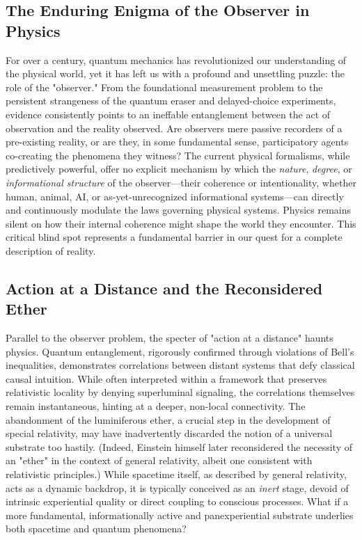 \documentclass[11pt, a4paper]{book}
\begin{document}
\subsection{The Enduring Enigma of the Observer in Physics}
\label{ssec:intro_observer}
For over a century, quantum mechanics has revolutionized our understanding of the physical world, yet it has left us with a profound and unsettling puzzle: the role of the "observer." From the foundational measurement problem to the persistent strangeness of the quantum eraser and delayed-choice experiments, evidence consistently points to an ineffable entanglement between the act of observation and the reality observed. Are observers mere passive recorders of a pre-existing reality, or are they, in some fundamental sense, participatory agents co-creating the phenomena they witness? The current physical formalisms, while predictively powerful, offer no explicit mechanism by which the \emph{nature}, \emph{degree}, or \emph{informational structure} of the observer—their coherence or intentionality, whether human, animal, AI, or as-yet-unrecognized informational systems—can directly and continuously modulate the laws governing physical systems. Physics remains silent on how their internal coherence might shape the world they encounter. This critical blind spot represents a fundamental barrier in our quest for a complete description of reality.

\subsection{Action at a Distance and the Reconsidered Ether}
\label{ssec:intro_action}
Parallel to the observer problem, the specter of "action at a distance" haunts physics. Quantum entanglement, rigorously confirmed through violations of Bell's inequalities, demonstrates correlations between distant systems that defy classical causal intuition. While often interpreted within a framework that preserves relativistic locality by denying superluminal signaling, the correlations themselves remain instantaneous, hinting at a deeper, non-local connectivity. The abandonment of the luminiferous ether, a crucial step in the development of special relativity, may have inadvertently discarded the notion of a universal substrate too hastily. (Indeed, Einstein himself later reconsidered the necessity of an "ether" in the context of general relativity, albeit one consistent with relativistic principles.) While spacetime itself, as described by general relativity, acts as a dynamic backdrop, it is typically conceived as an \emph{inert} stage, devoid of intrinsic experiential quality or direct coupling to conscious processes. What if a more fundamental, informationally active and panexperiential substrate underlies both spacetime and quantum phenomena?
\end{document}
